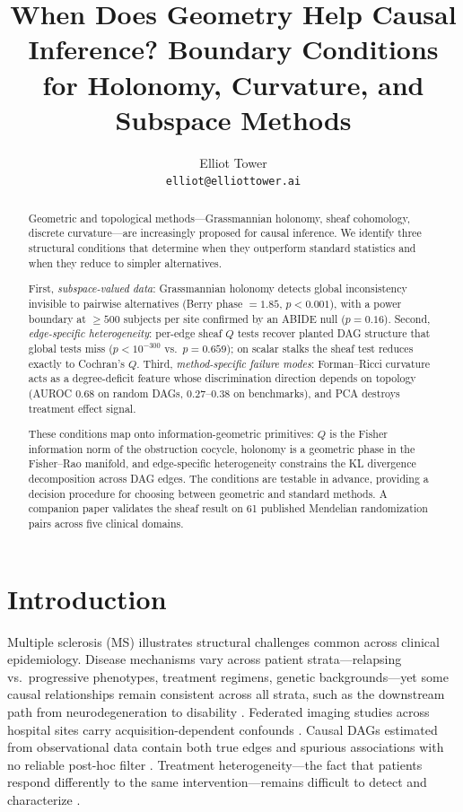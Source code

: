 \documentclass[11pt]{article}
\title{When Does Geometry Help Causal Inference? Boundary Conditions for Holonomy, Curvature, and Subspace Methods}
\author{Elliot Tower\\
\texttt{elliot@elliottower.ai}}
\date{}
\begin{document}
\maketitle

\begin{abstract}
Geometric and topological methods---Grassmannian holonomy, sheaf cohomology, discrete curvature---are increasingly proposed for causal inference. We identify three structural conditions that determine when they outperform standard statistics and when they reduce to simpler alternatives.

First, \emph{subspace-valued data}: Grassmannian holonomy detects global inconsistency invisible to pairwise alternatives (Berry phase $= 1.85$, $p < 0.001$), with a power boundary at $\geq 500$ subjects per site confirmed by an ABIDE null ($p = 0.16$). Second, \emph{edge-specific heterogeneity}: per-edge sheaf $Q$ tests recover planted DAG structure that global tests miss ($p < 10^{-300}$ vs.\ $p = 0.659$); on scalar stalks the sheaf test reduces exactly to Cochran's $Q$. Third, \emph{method-specific failure modes}: Forman--Ricci curvature acts as a degree-deficit feature whose discrimination direction depends on topology (AUROC $0.68$ on random DAGs, $0.27$--$0.38$ on benchmarks), and PCA destroys treatment effect signal.

These conditions map onto information-geometric primitives: $Q$ is the Fisher information norm of the obstruction cocycle, holonomy is a geometric phase in the Fisher--Rao manifold, and edge-specific heterogeneity constrains the KL divergence decomposition across DAG edges. The conditions are testable in advance, providing a decision procedure for choosing between geometric and standard methods. A companion paper validates the sheaf result on 61 published Mendelian randomization pairs across five clinical domains.
\end{abstract}

\section{Introduction}
\label{sec:intro}

Multiple sclerosis (MS) illustrates structural challenges common across clinical epidemiology.
Disease mechanisms vary across patient strata---relapsing vs.\ progressive phenotypes, treatment regimens, genetic backgrounds---yet some causal relationships remain consistent across all strata, such as the downstream path from neurodegeneration to disability \citep{lublin2014defining}.
Federated imaging studies across hospital sites carry acquisition-dependent confounds \citep{fortin2018harmonization}.
Causal DAGs estimated from observational data contain both true edges and spurious associations with no reliable post-hoc filter \citep{glymour2019review}.
Treatment heterogeneity---the fact that patients respond differently to the same intervention---remains difficult to detect and characterize \citep{athey2016recursive}.
\end{document}
